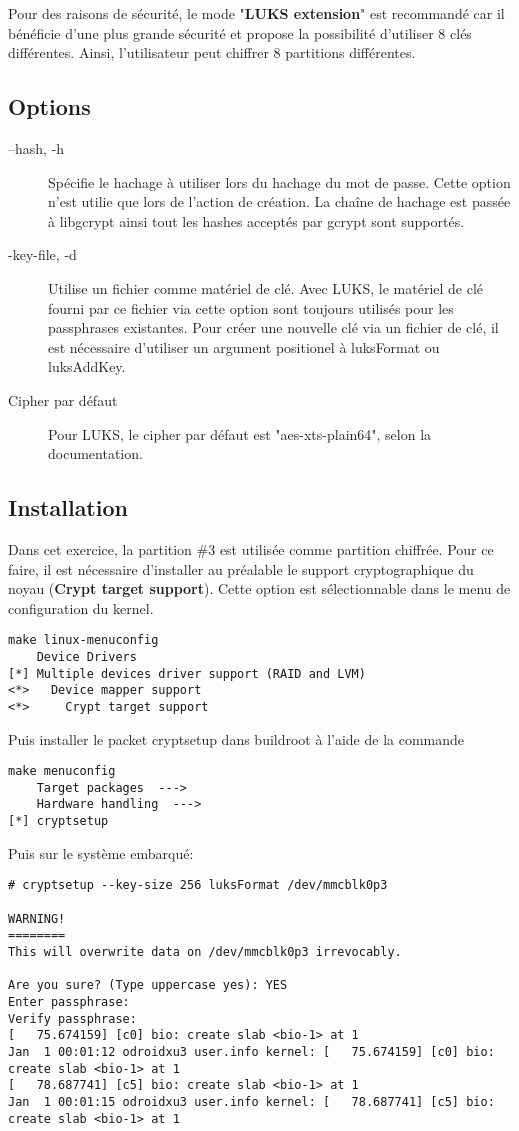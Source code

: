 Pour des raisons de sécurité, le mode "\textbf{LUKS extension}" est recommandé car il bénéficie d'une plus grande sécurité et propose la possibilité d'utiliser 8 clés différentes. Ainsi, l'utilisateur peut chiffrer 8 partitions différentes.

\subsection{Options}
\begin{description}
	\item[--hash, -h] Spécifie le hachage à utiliser lors du hachage du mot de passe. Cette option n'est utilie que lors de l'action de création. La chaîne de hachage est passée à libgcrypt ainsi tout les hashes acceptés par gcrypt sont supportés.
	\item[-key-file, -d] Utilise un fichier comme matériel de clé. Avec LUKS, le matériel de clé fourni par ce fichier via cette option sont toujours utilisés pour les passphrases existantes. Pour créer une nouvelle clé via un fichier de clé, il est nécessaire d'utiliser un argument positionel à luksFormat ou luksAddKey.
	\item[Cipher par défaut] Pour LUKS, le cipher par défaut est "aes-xts-plain64", selon la documentation. \cite{luksCipher}
\end{description}

\subsection{Installation}
Dans cet exercice, la partition \#3 est utilisée comme partition chiffrée. Pour ce faire, il est nécessaire d'installer au préalable le support cryptographique du noyau (\textbf{Crypt target support}). Cette option est sélectionnable dans le menu de configuration du kernel.
\begin{lstlisting}[style=Bash]
make linux-menuconfig
    Device Drivers
[*] Multiple devices driver support (RAID and LVM)
<*>   Device mapper support
<*>     Crypt target support
\end{lstlisting}
Puis installer le packet cryptsetup dans buildroot à l'aide de la commande
\begin{lstlisting}[style=Bash]
make menuconfig
    Target packages  --->
    Hardware handling  --->
[*] cryptsetup
\end{lstlisting}

Puis sur le système embarqué:
\begin{lstlisting}
# cryptsetup --key-size 256 luksFormat /dev/mmcblk0p3

WARNING!
========
This will overwrite data on /dev/mmcblk0p3 irrevocably.

Are you sure? (Type uppercase yes): YES
Enter passphrase: 
Verify passphrase: 
[   75.674159] [c0] bio: create slab <bio-1> at 1
Jan  1 00:01:12 odroidxu3 user.info kernel: [   75.674159] [c0] bio: create slab <bio-1> at 1
[   78.687741] [c5] bio: create slab <bio-1> at 1
Jan  1 00:01:15 odroidxu3 user.info kernel: [   78.687741] [c5] bio: create slab <bio-1> at 1
\end{lstlisting}

